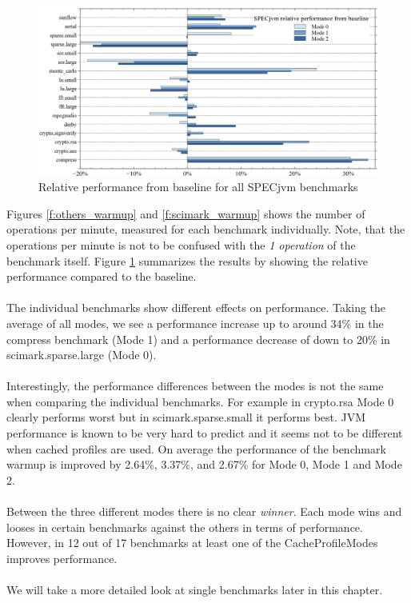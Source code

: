 \begin{figure}[ht]
  \begin{center}
    \centering
    \includegraphics[width=1.0\textwidth]{figures/all_warmup_variation.png}
    \caption{Relative performance from baseline for all SPECjvm benchmarks}
    \label{f:all_warmup_variation}
  \end{center}
\end{figure}
Figures \ref{f:others_warmup} and \ref{f:scimark_warmup} shows the number of operations per minute, measured for each benchmark individually. Note, that the operations per minute is not to be confused with the \textit{1 operation }of the benchmark itself.
Figure \ref{f:all_warmup_variation} summarizes the results by showing the relative performance compared to the baseline.
\\\\
The individual benchmarks show different effects on performance. Taking the average of all modes, we see a performance increase up to around 34\% in the compress benchmark (Mode 1) and a performance decrease of down to 20\% in scimark.sparse.large (Mode 0).
\\\\
Interestingly, the performance differences between the modes is not the same when comparing the individual benchmarks. For example in crypto.rsa Mode 0 clearly performs worst but in scimark.sparse.small it performs best.
JVM performance is known to be very hard to predict and it seems not to be different when cached profiles are used. On average the performance of the benchmark warmup is improved by 2.64\%, 3.37\%, and 2.67\% for Mode 0, Mode 1 and Mode 2.
\\\\
Between the three different modes there is no clear \textit{winner}. Each mode wins and looses in certain benchmarks against the others in terms of performance. However, in 12 out of 17 benchmarks at least one of the CacheProfileModes improves performance. 
\\\\
We will take a more detailed look at single benchmarks later in this chapter. 

